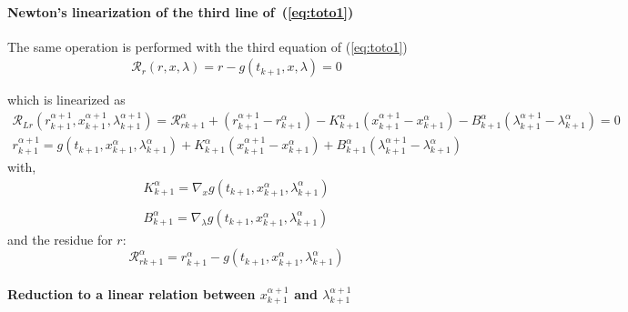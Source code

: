  \paragraph{Newton's linearization of the third  line of~(\ref{eq:toto1})}
The same operation is performed with the third equation of (\ref{eq:toto1})
\begin{equation}
  \begin{array}{l}
    \mathcal R_r(r,x,\lambda)=r-g(t_{k+1},x,\lambda) =0\\ \\  \end{array}
\end{equation}
which is linearized as
\begin{equation}
  \label{eq:NL9}
  \begin{array}{l}
      \mathcal R_{Lr}(r^{\alpha+1}_{k+1},x^{\alpha+1}_{k+1},\lambda^{\alpha+1}_{k+1}) = \mathcal
      R_{rk+1}^{\alpha} + (r^{\alpha+1}_{k+1} - r^{\alpha}_{k+1}) -
      K^{\alpha}_{k+1}(x^{\alpha+1}_{k+1} - x^{\alpha}_{k+1})- B^{\alpha}_{k+1}(\lambda^{\alpha+1}_{k+1} -
      \lambda^{\alpha}_{k+1})=0
    \end{array}
  \end{equation}
\begin{equation}
  \label{eq:rrL}
  \begin{array}{l}
    \boxed{r^{\alpha+1}_{k+1} = g(t_{k+1},x ^{\alpha}_{k+1},\lambda ^{\alpha}_{k+1}) +
      K^{\alpha}_{k+1}(x^{\alpha+1}_{k+1} - x^{\alpha}_{k+1})
      + B^{\alpha}_{k+1}(\lambda^{\alpha+1}_{k+1} - \lambda^{\alpha}_{k+1})
    }
  \end{array}
\end{equation}
with,
\begin{equation}
     \begin{array}{l}
  K^{\alpha}_{k+1} = \nabla_xg(t_{k+1},x^{\alpha}_{k+1},\lambda ^{\alpha}_{k+1})  \\ \\
  B^{\alpha}_{k+1} = \nabla_{\lambda}g(t_{k+1},x^{\alpha}_{k+1},\lambda ^{\alpha}_{k+1})
 \end{array}
\end{equation}
and the  residue for $r$:
\begin{equation}
\boxed{\mathcal
      R_{rk+1}^{\alpha} = r^{\alpha}_{k+1} - g(t_{k+1},x^{\alpha}_{k+1},\lambda ^{\alpha}_{k+1})}
  \end{equation}


\paragraph{Reduction to a linear relation between  $x^{\alpha+1}_{k+1}$ and $\lambda^{\alpha+1}_{k+1}$}

